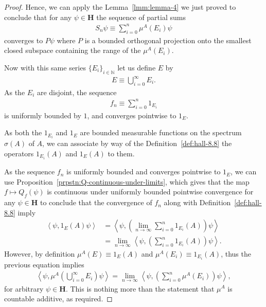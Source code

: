 \begin{proof}
Hence, we can apply the Lemma~\ref{lmm:lemma-4} we just proved to conclude that for any $\psi \in \mathbf{H}$ the sequence of partial sums
\begin{align}
    S_n\psi \equiv \sum_{i = 0}^n \mu^A(E_i)\psi
\end{align}
converges to $P\psi$ where $P$ is a bounded orthogonal projection onto the smallest closed subspace containing the range of the $\mu^A(E_i)$.

Now with this same series $\{ E_i \}_{i \in \mathbb{N}}$ let us define $E$ by
\begin{align}
    E \equiv \bigcup_{i = 0}^\infty E_i.
\end{align}
As the $E_i$ are disjoint, the sequence
\begin{align}
    f_n \equiv \sum_{i = 0}^n 1_{E_i}
\end{align}
is uniformly bounded by $1$, and converges pointwise to $1_E$.

As both the $1_{E_i}$ and $1_E$ are bounded measurable functions on the spectrum $\sigma(A)$ of $A$, we can associate by way of the Definition~\ref{def:hall-8.8} the operators $1_{E_i}(A)$ and $1_E(A)$ to them.

As the sequence $f_n$ is uniformly bounded and converges pointwise to $1_E$, we can use Proposition~\ref{prpstn:Q-continuous-under-limits}, which gives that the map $f \mapsto Q_f(\psi)$ is continuous under uniformly bounded pointwise convergence for any $\psi \in \mathbf{H}$ to conclude that the convergence of $f_n$ along with Definition~\ref{def:hall-8.8} imply
\begin{align}
    \left< \psi, 1_E(A)\psi \right> &= \left< \psi, \left( \lim\limits_{n \rightarrow \infty} \sum_{i = 0}^n 1_{E_i}(A) \right) \psi \right> \\
                                    &= \lim\limits_{n \rightarrow \infty} \left< \psi, \left( \sum_{i = 0}^n 1_{E_i}(A) \right) \psi \right>.
\end{align}
However, by definition $\mu^A(E) \equiv 1_E(A)$ and $\mu^A(E_i) \equiv 1_{E_i}(A)$, thus the previous equation implies
\begin{align}
    \left< \psi, \mu^A\left( \bigcup_{i = 0}^\infty E_i \right) \psi \right> = \lim\limits_{n \rightarrow \infty} \left< \psi, \left( \sum_{i = 0}^n \mu^A(E_i) \right) \psi \right>,
\end{align}
for arbitrary $\psi \in \mathbf{H}$. This is nothing more than the statement that $\mu^A$ is countable additive, as required.
\end{proof}


